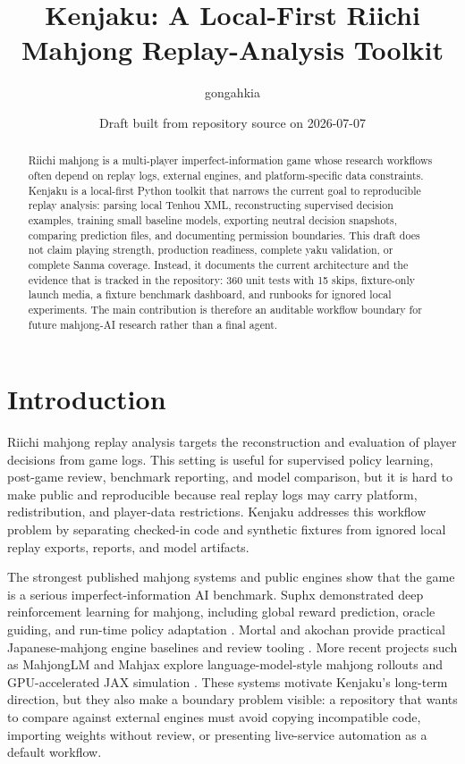 \documentclass[11pt]{article}
\title{Kenjaku: A Local-First Riichi Mahjong Replay-Analysis Toolkit}
\author{gongahkia}
\date{Draft built from repository source on 2026-07-07}
\begin{document}
\maketitle

\begin{abstract}
Riichi mahjong is a multi-player imperfect-information game whose research workflows often depend
on replay logs, external engines, and platform-specific data constraints. Kenjaku is a local-first
Python toolkit that narrows the current goal to reproducible replay analysis: parsing local Tenhou
XML, reconstructing supervised decision examples, training small baseline models, exporting neutral
decision snapshots, comparing prediction files, and documenting permission boundaries. This draft
does not claim playing strength, production readiness, complete yaku validation, or complete Sanma coverage.
Instead, it documents the current architecture and the evidence that is tracked in the repository:
360 unit tests with 15 skips, fixture-only launch media, a fixture benchmark dashboard, and runbooks
for ignored local experiments. The main contribution is therefore an auditable workflow boundary for
future mahjong-AI research rather than a final agent.
\end{abstract}

\section{Introduction}

Riichi mahjong replay analysis targets the reconstruction and evaluation of player decisions from
game logs. This setting is useful for supervised policy learning, post-game review, benchmark
reporting, and model comparison, but it is hard to make public and reproducible because real replay
logs may carry platform, redistribution, and player-data restrictions. Kenjaku addresses this
workflow problem by separating checked-in code and synthetic fixtures from ignored local replay
exports, reports, and model artifacts.

The strongest published mahjong systems and public engines show that the game is a serious
imperfect-information AI benchmark. Suphx demonstrated deep reinforcement learning for mahjong,
including global reward prediction, oracle guiding, and run-time policy adaptation
\cite{suphx-arxiv}. Mortal and akochan provide practical Japanese-mahjong engine baselines and
review tooling \cite{mortal-docs,mortal-github,akochan-github,mjai-reviewer}. More recent projects
such as MahjongLM and Mahjax explore language-model-style mahjong rollouts and GPU-accelerated JAX
simulation \cite{mahjonglm-github,mahjonglm-hf,mahjax-arxiv,mahjax-github}. These systems motivate
Kenjaku's long-term direction, but they also make a boundary problem visible: a repository that
wants to compare against external engines must avoid copying incompatible code, importing weights
without review, or presenting live-service automation as a default workflow.
\end{document}
